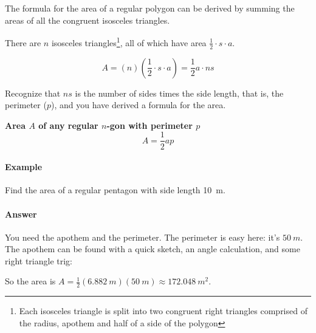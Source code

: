 \newpage

The formula for the area of a regular polygon can be derived by summing the areas of all the congruent isosceles triangles.

There are $n$ isosceles triangles\footnote{Each isosceles triangle is split into two congruent right triangles comprised of the radius, apothem and half of a side of the polygon}, all of which have area $\frac{1}{2}\cdot s \cdot a$.

\[ A = (n)\left (\frac{1}{2}\cdot s \cdot a\right ) = \frac{1}{2} a \cdot ns\]

Recognize that $ns$ is the number of sides times the side length, that is, the perimeter ($p$), and you have derived a formula for the area.

\begin{tcolorbox}
\textbf{Area $A$ of any regular $n$-gon with perimeter $p$}\\

\[A=\frac{1}{2}ap\]

\end{tcolorbox}


\paragraph{Example} Find the area of a regular pentagon with side length 10\, m.

\paragraph{Answer} You need the apothem and the perimeter. 
The perimeter is easy here: it's $50~m$. 
The apothem can be found with a quick sketch, an angle calculation,
and some right triangle trig:
	\begin{center}
	\end{center}
So the area is $A=\frac{1}{2}(6.882~m)(50~m)\approx 172.048~m^2$.

